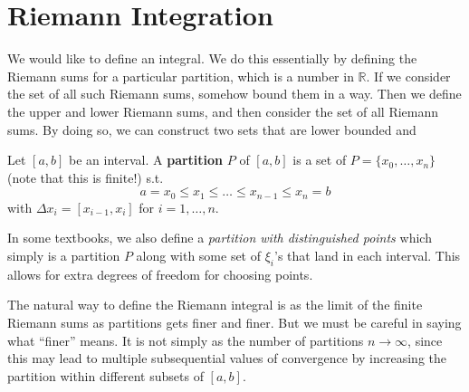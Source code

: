 \section{Riemann Integration} 

  We would like to define an integral. We do this essentially by defining the Riemann sums for a particular partition, which is a number in $\mathbb{R}$. If we consider the set of all such Riemann sums, somehow bound them in a way. Then we define the upper and lower Riemann sums, and then consider the set of all Riemann sums. By doing so, we can construct two sets that are lower bounded and

  \begin{definition}[Partition]
    Let $[a, b]$ be an interval. A \textbf{partition} $P$ of $[a, b]$ is a set of $P = \{x_0, \ldots, x_n\}$ (note that this is finite!) s.t. 
    \begin{equation}
      a = x_0 \leq x_1 \leq \ldots \leq x_{n-1} \leq x_n = b
    \end{equation}
    with $\Delta x_i = [x_{i-1}, x_i]$ for $i = 1, \ldots, n$. 
  \end{definition}

  In some textbooks, we also define a \textit{partition with distinguished points} which simply is a partition $P$ along with some set of $\xi_i$'s that land in each interval. This allows for extra degrees of freedom for choosing points.  

  The natural way to define the Riemann integral is as the limit of the finite Riemann sums as partitions gets finer and finer.  But we must be careful in saying what ``finer'' means. It is not simply as the number of partitions $n \rightarrow \infty$, since this may lead to multiple subsequential values of convergence by increasing the partition within different subsets of $[a,b]$. 

